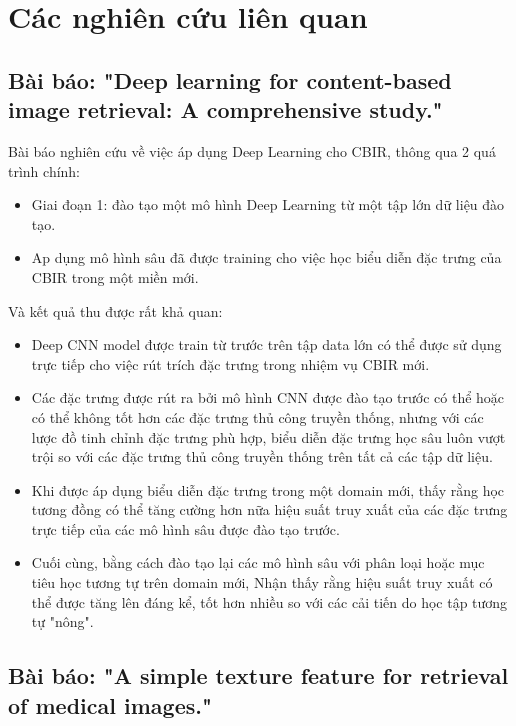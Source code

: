 \documentclass[a4paper,14pt]{extreport}
\begin{document}
\section{Các nghiên cứu liên quan}
\subsection{Bài báo: "Deep learning for content-based image retrieval: A comprehensive study." \cite{paper-1}}

Bài báo nghiên cứu về việc áp dụng Deep Learning cho CBIR, thông qua 2 quá trình chính: 

\begin{itemize}
        \item Giai đoạn 1: đào tạo một mô hình Deep Learning từ một tập lớn dữ liệu đào tạo.
        \item Ap dụng mô hình sâu đã được training cho việc học biểu diễn đặc trưng của CBIR trong một miền mới.
\end{itemize}

Và kết quả thu được rất khả quan:

\begin{itemize}
        \item Deep CNN model được train từ trước trên tập data lớn có thể được sử dụng trực tiếp cho việc rút trích đặc trưng trong nhiệm vụ CBIR mới.
        \item Các đặc trưng được rút ra bởi mô hình CNN được đào tạo trước có thể hoặc có thể không tốt hơn các đặc trưng thủ công truyền thống, nhưng với các lược đồ tinh chỉnh đặc trưng phù hợp, biểu diễn đặc trưng học sâu luôn vượt trội so với các đặc trưng thủ công truyền thống trên tất cả các tập dữ liệu.
        \item Khi được áp dụng biểu diễn đặc trưng trong một domain mới, thấy rằng học tương đồng có thể tăng cường hơn nữa hiệu suất truy xuất của các đặc trưng trực tiếp của các mô hình sâu được đào tạo trước.
        \item Cuối cùng, bằng cách đào tạo lại các mô hình sâu với phân loại hoặc mục tiêu học tương tự trên domain mới, Nhận thấy rằng hiệu suất truy xuất có thể được tăng lên đáng kể, tốt hơn nhiều so với các cải tiến do học tập tương tự "nông".

\end{itemize}

\subsection{Bài báo: "A simple texture feature for retrieval of medical images." \cite{paper-2}}
\end{document}
